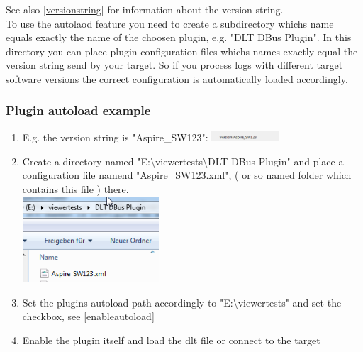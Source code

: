 \documentclass[a4paper,11pt]{article}
\begin{document}
See also \autoref{versionstring} for information about the version string.\\

To use the autolaod feature you need to create a subdirectory whichs name equals exactly the name of the choosen plugin, e.g.
"DLT DBus Plugin". In this directory you can place plugin configuration files whichs names exactly equal
the version string send by your target. So if you process logs with different target software versions
the correct configuration is automatically loaded accordingly.

\subsubsection{Plugin autoload example}

\begin{enumerate}
\item E.g. the  version string is "Aspire\_SW123":\linebreak
\vspace{0.2cm}
\includegraphics[width=0.2\textwidth]{images/versionstring_ecu.png}


\item Create a directory named "E:\textbackslash viewertests\textbackslash DLT DBus Plugin"
and place a configuration file namend "Aspire\_SW123.xml", ( or so named folder which contains this file ) there.\\

\vspace{0.2cm}
\includegraphics[width=0.4\textwidth]{images/autoloadexample_filename.png}

\item Set the plugins autoload path accordingly to "E:\textbackslash viewertests" and set the checkbox, see \autoref{enableautoload} \linebreak


\item Enable the plugin itself and load the dlt file or connect to the target


\end{enumerate}
\end{document}
